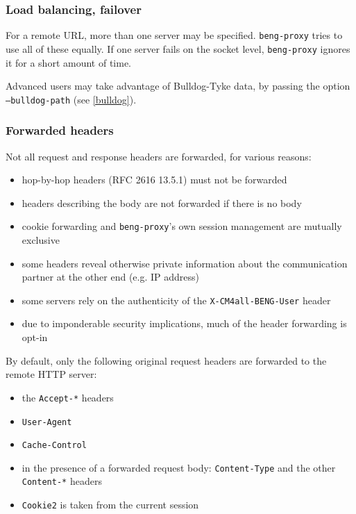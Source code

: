 \documentclass[a4paper,12pt]{article}
\begin{document}
\subsubsection{Load balancing, failover}
\label{balancing}

For a remote URL, more than one server may be specified.
\texttt{beng-proxy} tries to use all of these equally.  If one server
fails on the socket level, \texttt{beng-proxy} ignores it for a short
amount of time.

Advanced users may take advantage of Bulldog-Tyke data, by passing
the option \texttt{--bulldog-path} (see \ref{bulldog}).

\subsubsection{Forwarded headers}

Not all request and response headers are forwarded, for various
reasons:

\begin{itemize}
\item hop-by-hop headers (RFC 2616 13.5.1) must not be forwarded
\item headers describing the body are not forwarded if there is no
  body
\item cookie forwarding and \texttt{beng-proxy}'s own session
  management are mutually exclusive
\item some headers reveal otherwise private information about the
  communication partner at the other end (e.g. IP address)
\item some servers rely on the authenticity of the
  \texttt{X-CM4all-BENG-User} header
\item due to imponderable security implications, much of the header
  forwarding is opt-in
\end{itemize}

By default, only the following original request headers are forwarded
to the remote HTTP server:

\begin{itemize}
\item the \texttt{Accept-*} headers
\item \texttt{User-Agent}
\item \texttt{Cache-Control}
\item in the presence of a forwarded request body:
  \texttt{Content-Type} and the other \texttt{Content-*} headers
\item \texttt{Cookie2} is taken from the current session
\end{itemize}
\end{document}

